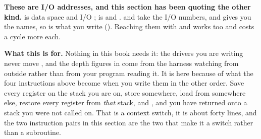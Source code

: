 \textbf{These are I/O addresses, and this section has been quoting the other kind.}  is
data space  and I/O ;  is  and . 
and  take the I/O numbers, and  gives you the names, so
 is what you write (). Reaching them with  and
 works too and costs a cycle more each.

\textbf{What this is for.} Nothing in this book needs it: the drivers you are writing never move
, and the depth figures in  come from the harness watching 
from outside rather than from your program reading it. It is here because of what the four
instructions above become when you write them in the other order. Save every register on the stack
you are on, store  somewhere, load  from somewhere else, restore every register
from \emph{that} stack, and , and you have returned onto a stack you were not called on.
That is a context switch, it is about forty lines, and the two instruction pairs in this section are
the two that make it a switch rather than a subroutine.

